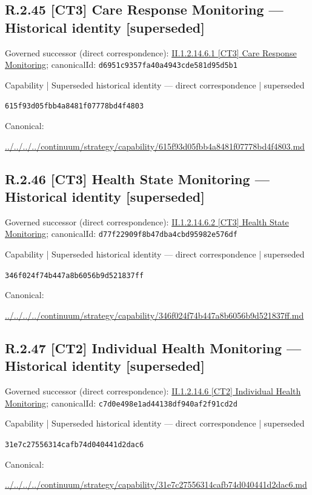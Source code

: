 \documentclass[10pt,a4paper]{article}
\begin{document}
\subsection*{R.2.45 [CT3] Care Response Monitoring — Historical identity [superseded]}
Governed successor (direct correspondence): \hyperref[element-d6951c9357fa40a4943cde581d95d5b1]{II.1.2.14.6.1 [CT3] Care Response Monitoring}; canonicalId: \texttt{d6951c9357fa40a4943cde581d95d5b1}\par
\label{element-615f93d05fbb4a8481f07778bd4f4803}
{\small Capability | Superseded historical identity — direct correspondence | superseded}\par
\texttt{615f93d05fbb4a8481f07778bd4f4803}\par
Canonical: \par
{\footnotesize\url{../../../../continuum/strategy/capability/615f93d05fbb4a8481f07778bd4f4803.md}}\par
\subsection*{R.2.46 [CT3] Health State Monitoring — Historical identity [superseded]}
Governed successor (direct correspondence): \hyperref[element-d77f22909f8b47dba4cbd95982e576df]{II.1.2.14.6.2 [CT3] Health State Monitoring}; canonicalId: \texttt{d77f22909f8b47dba4cbd95982e576df}\par
\label{element-346f024f74b447a8b6056b9d521837ff}
{\small Capability | Superseded historical identity — direct correspondence | superseded}\par
\texttt{346f024f74b447a8b6056b9d521837ff}\par
Canonical: \par
{\footnotesize\url{../../../../continuum/strategy/capability/346f024f74b447a8b6056b9d521837ff.md}}\par
\subsection*{R.2.47 [CT2] Individual Health Monitoring — Historical identity [superseded]}
Governed successor (direct correspondence): \hyperref[element-c7d0e498e1ad44138df940af2f91cd2d]{II.1.2.14.6 [CT2] Individual Health Monitoring}; canonicalId: \texttt{c7d0e498e1ad44138df940af2f91cd2d}\par
\label{element-31e7c27556314cafb74d040441d2dac6}
{\small Capability | Superseded historical identity — direct correspondence | superseded}\par
\texttt{31e7c27556314cafb74d040441d2dac6}\par
Canonical: \par
{\footnotesize\url{../../../../continuum/strategy/capability/31e7c27556314cafb74d040441d2dac6.md}}\par
\end{document}

